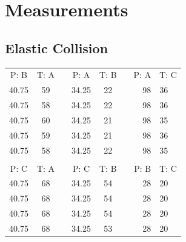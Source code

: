 \documentclass{scrreprt}
\begin{document}
\section{Measurements}
\subsection{Elastic Collision}
\begin{table}[H]
	\centering
	\begin{tabular}{ccp{1.5cm}ccp{1.5cm}rl}
 P: B &   T: A &            &  P: A &   T: B &            &  P: A &   T: C \\\cline{1-2}\cline{4-5}\cline{7-8}

     40.75 &         59 &            &      34.25 &         22 &            &         98 &         36 \\

     40.75 &         58 &            &      34.25 &         22 &            &         98 &         36 \\

     40.75 &         60 &            &      34.25 &         21 &            &         98 &         35 \\

     40.75 &         59 &            &      34.25 &         21 &            &         98 &         36 \\

     40.75 &         58 &            &      34.25 &         22 &            &         98 &         35 \\

           &            &            &            &            &            &            &            \\

 P: C &   T: A &            &  P: C &   T: B &            &  P: B &   T: C \\\cline{1-2}\cline{4-5}\cline{7-8}

     40.75 &         68 &            &      34.25 &         54 &            &         28 &         20 \\

     40.75 &         68 &            &      34.25 &         54 &            &         28 &         20 \\

     40.75 &         68 &            &      34.25 &         54 &            &         28 &         20 \\

     40.75 &         68 &            &      34.25 &         53 &            &         28 &         20 \\


\end{tabular}
\end{table}
\end{document}
